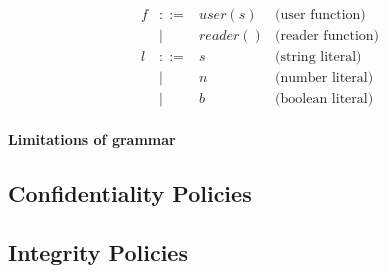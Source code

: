 \[\begin{array}{rcll}
    f           & ::=   & user(s)                           & \text{(user function)} \\
                & |     & reader()                          & \text{(reader function)} \\
    l           & ::=   & s                                 & \text{(string literal)} \\
                & |     & n                                 & \text{(number literal)} \\
                & |     & b                                 & \text{(boolean literal)}
    
\end{array}
\]

\paragraph{Limitations of grammar}

\subsection{Confidentiality Policies}


\subsection{Integrity Policies}